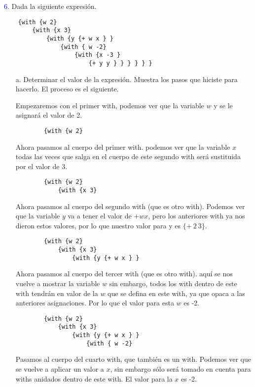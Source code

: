 {\textcolor{blue}{6.}} Dada la siguiente expresión.
\begin{lstlisting}
    {with {w 2}
        {with {x 3}
            {with {y {+ w x } }
                {with { w -2}
                    {with {x -3 }
                        {+ y y } } } } } }
\end{lstlisting}
\begin{enumerate}
    \item[a.] Determinar el valor de la expresión. Muestra los pasos que hiciste para hacerlo.
    El proceso es el siguiente.

    Empezaremos con el primer with, podemos ver que la variable $w$ y se le asignará el valor de 2.
    \begin{lstlisting}
        {with {w 2}
    \end{lstlisting}

    Ahora pasamos al cuerpo del primer with. podemos ver que la variable $x$ todas las veces que salga en el cuerpo de
    este segundo with será sustituida por el valor de 3.

    \begin{lstlisting}
        {with {w 2}
            {with {x 3}
    \end{lstlisting}

    Ahora pasamos al cuerpo del segundo with (que es otro with). Podemos ver que la variable $y$ va a tener el valor de ${+ w x}$, pero los anteriores
    with ya nos dieron estos valores, por lo que nuestro valor para y es $\{+ \ 2 \ 3 \}$.

    \begin{lstlisting}
        {with {w 2}
            {with {x 3}
                {with {y {+ w x } }
    \end{lstlisting}

    Ahora pasamos al cuerpo del tercer with (que es otro with). aquí se nos vuelve a mostrar la variable $w$ sin embargo, todos los with dentro de este with
    tendrán en valor de la $w$ que se defina en este with, ya que opaca a las anteriores asignaciones. Por lo que el valor para esta $w$ es
    -2.

    \begin{lstlisting}
        {with {w 2}
            {with {x 3}
                {with {y {+ w x } }
                    {with { w -2}
    \end{lstlisting}

    Pasamos al cuerpo del cuarto with, que también es un with. Podemos ver que se vuelve a aplicar un valor a $x$, sin embargo sólo será tomado
    en cuenta para withs anidados dentro de este with. El valor para la $x$ es -2.


\end{enumerate}
